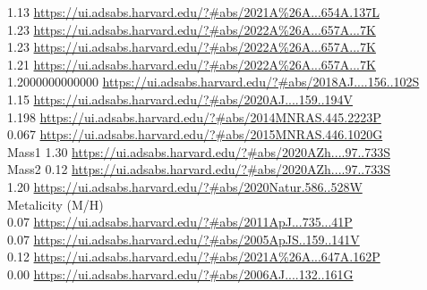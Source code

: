 1.13 \url{https://ui.adsabs.harvard.edu/?#abs/2021A%26A...654A.137L}\\
1.23 \url{https://ui.adsabs.harvard.edu/?#abs/2022A%26A...657A...7K}\\
1.23 \url{https://ui.adsabs.harvard.edu/?#abs/2022A%26A...657A...7K}\\
1.21 \url{https://ui.adsabs.harvard.edu/?#abs/2022A%26A...657A...7K}\\
1.2000000000000 \url{https://ui.adsabs.harvard.edu/?#abs/2018AJ....156..102S}\\
1.15 \url{https://ui.adsabs.harvard.edu/?#abs/2020AJ....159..194V}\\
1.198 \url{https://ui.adsabs.harvard.edu/?#abs/2014MNRAS.445.2223P}\\
0.067 \url{https://ui.adsabs.harvard.edu/?#abs/2015MNRAS.446.1020G}\\
Mass1 1.30  \url{https://ui.adsabs.harvard.edu/?#abs/2020AZh....97..733S}\\
Mass2 0.12 \url{https://ui.adsabs.harvard.edu/?#abs/2020AZh....97..733S}\\
1.20 \url{https://ui.adsabs.harvard.edu/?#abs/2020Natur.586..528W}\\

Metalicity (M/H)\\
0.07 \url{https://ui.adsabs.harvard.edu/?#abs/2011ApJ...735...41P}\\
0.07 \url{https://ui.adsabs.harvard.edu/?#abs/2005ApJS..159..141V}\\
0.12 \url{https://ui.adsabs.harvard.edu/?#abs/2021A%26A...647A.162P}\\
0.00 \url{https://ui.adsabs.harvard.edu/?#abs/2006AJ....132..161G}\\

